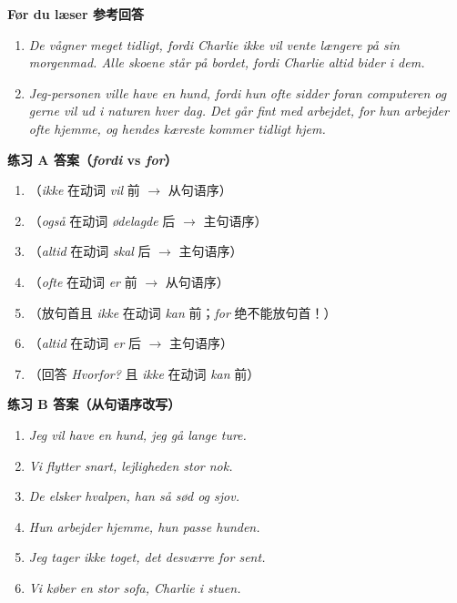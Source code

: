 \begin{answerbox}
\textbf{Før du læser 参考回答}
\begin{enumerate}
  \item \textit{De vågner meget tidligt, fordi Charlie ikke vil vente længere på sin morgenmad. Alle skoene står på bordet, fordi Charlie altid bider i dem.}
  \item \textit{Jeg-personen ville have en hund, fordi hun ofte sidder foran computeren og gerne vil ud i naturen hver dag. Det går fint med arbejdet, for hun arbejder ofte hjemme, og hendes kæreste kommer tidligt hjem.}
\end{enumerate}

\textbf{练习 A 答案（\textit{fordi} vs \textit{for}）}
\begin{enumerate}
  \item {}（\textit{ikke} 在动词 \textit{vil} 前 $\rightarrow$ 从句语序）
  \item {}（\textit{også} 在动词 \textit{ødelagde} 后 $\rightarrow$ 主句语序）
  \item {}（\textit{altid} 在动词 \textit{skal} 后 $\rightarrow$ 主句语序）
  \item {}（\textit{ofte} 在动词 \textit{er} 前 $\rightarrow$ 从句语序）
  \item {}（放句首且 \textit{ikke} 在动词 \textit{kan} 前；\textit{for} 绝不能放句首！）
  \item {}（\textit{altid} 在动词 \textit{er} 后 $\rightarrow$ 主句语序）
  \item {}（回答 \textit{Hvorfor?} 且 \textit{ikke} 在动词 \textit{kan} 前）
\end{enumerate}

\textbf{练习 B 答案（从句语序改写）}
\begin{enumerate}
  \item \textit{Jeg vil have en hund,  jeg  gå lange ture.}
  \item \textit{Vi flytter snart,  lejligheden  stor nok.}
  \item \textit{De elsker hvalpen,  han  så sød og sjov.}
  \item \textit{Hun arbejder hjemme,  hun  passe hunden.}
  \item \textit{Jeg tager ikke toget,  det desværre  for sent.}
  \item \textit{Vi køber en stor sofa,  Charlie  i stuen.}
\end{enumerate}


\end{answerbox}

